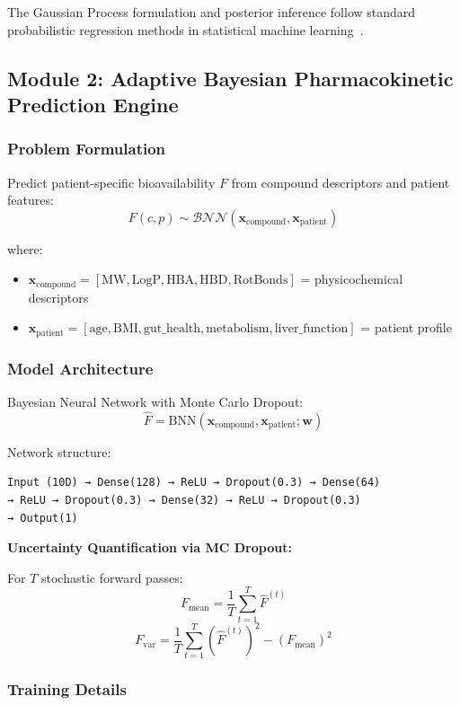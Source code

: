 \documentclass[11pt,a4paper]{article}
\begin{document}
The Gaussian Process formulation and posterior inference follow standard probabilistic regression methods in statistical machine learning~\cite{rasmussen2006}.

\subsection{Module 2: Adaptive Bayesian Pharmacokinetic Prediction Engine}

\subsubsection{Problem Formulation}

Predict patient-specific bioavailability $F$ from compound descriptors and patient features:
\[
F(c, p) \sim \mathcal{BNN}(\mathbf{x}_{\text{compound}}, \mathbf{x}_{\text{patient}})
\]

where:
\begin{itemize}
    \item $\mathbf{x}_{\text{compound}} = [\text{MW}, \text{LogP}, \text{HBA}, \text{HBD}, \text{RotBonds}]$ = physicochemical descriptors
    \item $\mathbf{x}_{\text{patient}} = [\text{age}, \text{BMI}, \text{gut\_health}, \text{metabolism}, \text{liver\_function}]$ = patient profile
\end{itemize}

\subsubsection{Model Architecture}

Bayesian Neural Network with Monte Carlo Dropout:
\[
\hat{F} = \text{BNN}(\mathbf{x}_{\text{compound}}, \mathbf{x}_{\text{patient}}; \mathbf{w})
\]

Network structure:
\begin{verbatim}
Input (10D) → Dense(128) → ReLU → Dropout(0.3) → Dense(64) 
→ ReLU → Dropout(0.3) → Dense(32) → ReLU → Dropout(0.3) 
→ Output(1)
\end{verbatim}

\textbf{Uncertainty Quantification via MC Dropout:}

For $T$ stochastic forward passes:
\[
F_{\text{mean}} = \frac{1}{T}\sum_{t=1}^{T} \hat{F}^{(t)}
\]
\[
F_{\text{var}} = \frac{1}{T}\sum_{t=1}^{T} \left(\hat{F}^{(t)}\right)^2 - \left(F_{\text{mean}}\right)^2
\]

\subsubsection{Training Details}
\end{document}
